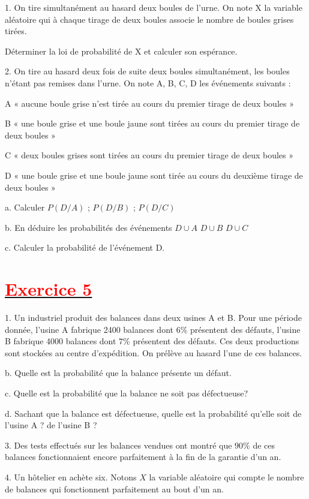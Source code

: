 \documentclass[12pt]{article}
\begin{document}
    1. On tire simultanément au hasard deux boules de l’urne. On note X la variable aléatoire qui à chaque tirage de deux boules associe le nombre de boules grises tirées. 
    
      Déterminer la loi de probabilité de X et calculer son espérance.
      
    2. On tire au hasard deux fois de suite deux boules simultanément, les boules n’étant pas remises dans l’urne.  On note A, B, C, D les événements suivants :
    
     A « aucune boule grise n’est tirée au cours du premier tirage de deux boules »
     
     B « une boule grise et une boule jaune sont tirées au cours du premier tirage de deux boules »
     
     C « deux boules grises sont tirées au cours du premier tirage de deux boules »
     
     D « une boule grise et une boule jaune sont tirée au cours du deuxième tirage de deux boules »
     
      a. Calculer $P (D/A)$ ; $P (D/B)$ ; $P (D/C)$
      
      b. En déduire les probabilités des événements $D\cup A$ $D\cup B$ $D\cup C$
      
      c. Calculer la probabilité de l’événement D.
\section*{\underline{\textbf{\textcolor{red}{Exercice 5}}}}
1. Un industriel produit des balances dans deux usines A et B. Pour une période donnée, l’usine A fabrique 2400 balances dont $6\%$ présentent des défauts, l’usine B fabrique 4000 balances dont $7\%$ présentent des défauts. Ces deux productions sont stockées au centre d’expédition. On prélève au hasard l’une de ces balances.

    b. Quelle est la probabilité que la balance présente un défaut.
    
    c. Quelle est la probabilité que la balance ne soit pas défectueuse?
    
    d. Sachant que la balance est défectueuse, quelle est la probabilité qu’elle soit de l’usine A ? de l’usine B ?

3. Des tests effectués sur les balances vendues ont montré que $90\%$ de ces balances fonctionnaient encore parfaitement à la fin de la garantie d’un an.

4. Un hôtelier en achète six. Notons $X$ la variable aléatoire qui compte le nombre de balances qui fonctionnent parfaitement au bout d’un an.
\end{document}
